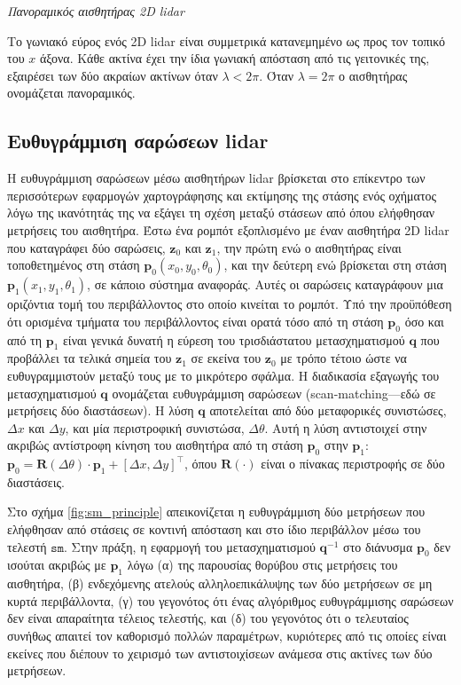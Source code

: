 \begin{bw_box}
\begin{definition}
  \textit{Πανοραμικός αισθητήρας 2D lidar}

  Το γωνιακό εύρος ενός 2D lidar είναι συμμετρικά κατανεμημένο ως προς τον
  τοπικό του $x$ άξονα. Κάθε ακτίνα έχει την ίδια γωνιακή απόσταση από τις
  γειτονικές της, εξαιρέσει των δύο ακραίων ακτίνων όταν $\lambda < 2\pi$.
  Όταν $\lambda = 2\pi$ ο αισθητήρας ονομάζεται πανοραμικός.
\end{definition}
\end{bw_box}



\subsection{Ευθυγράμμιση σαρώσεων lidar}
\label{subsec:01_01_02_5}

Η ευθυγράμμιση σαρώσεων μέσω αισθητήρων lidar βρίσκεται στο επίκεντρο των
περισσότερων εφαρμογών χαρτογράφησης και εκτίμησης της στάσης ενός οχήματος
λόγω της ικανότητάς της να εξάγει τη σχέση μεταξύ στάσεων από όπου ελήφθησαν
μετρήσεις του αισθητήρα. Έστω ένα ρομπότ εξοπλισμένο με έναν αισθητήρα 2D lidar
που καταγράφει δύο σαρώσεις, $\bm{z}_0$ και $\bm{z}_1$, την πρώτη ενώ ο
αισθητήρας είναι τοποθετημένος στη στάση $\bm{p}_0(x_0,y_0,\theta_0)$, και την
δεύτερη ενώ βρίσκεται στη στάση $\bm{p}_1(x_1,y_1,\theta_1)$, σε κάποιο σύστημα
αναφοράς. Αυτές οι σαρώσεις καταγράφουν μια οριζόντια τομή του περιβάλλοντος
στο οποίο κινείται το ρομπότ. Υπό την προϋπόθεση ότι ορισμένα τμήματα του
περιβάλλοντος είναι ορατά τόσο από τη στάση $\bm{p}_0$ όσο και από τη
$\bm{p}_1$ είναι γενικά δυνατή η εύρεση του τρισδιάστατου μετασχηματισμού
$\bm{q}$ που προβάλλει τα τελικά σημεία του $\bm{z}_1$ σε εκείνα του $\bm{z}_0$
με τρόπο τέτοιο ώστε να ευθυγραμμιστούν μεταξύ τους με το μικρότερο σφάλμα. Η
διαδικασία εξαγωγής του μετασχηματισμού $\bm{q}$ ονομάζεται ευθυγράμμιση
σαρώσεων (scan-matching---εδώ σε μετρήσεις δύο διαστάσεων). Η λύση $\bm{q}$
αποτελείται από δύο μεταφορικές συνιστώσες, $\Delta x$ και $\Delta y$, και μία
περιστροφική συνιστώσα, $\Delta\theta$. Αυτή η λύση αντιστοιχεί στην ακριβώς
αντίστροφη κίνηση του αισθητήρα από τη στάση $\bm{p}_0$ στην $\bm{p}_1$:
$\bm{p}_0 = \bm{R}(\Delta\theta) \cdot \bm{p}_1 + [\Delta x, \Delta y]^{\top}$,
όπου $\bm{R}(\cdot)$ είναι ο πίνακας περιστροφής σε δύο διαστάσεις.

Στο σχήμα \ref{fig:sm_principle} απεικονίζεται η ευθυγράμμιση δύο μετρήσεων που
ελήφθησαν από στάσεις σε κοντινή απόσταση και στο ίδιο περιβάλλον μέσω του
τελεστή $\texttt{sm}$. Στην πράξη, η εφαρμογή του μετασχηματισμού $\bm{q}^{-1}$
στο διάνυσμα $\bm{p}_0$ δεν ισούται ακριβώς με $\bm{p}_1$ λόγω (α) της
παρουσίας θορύβου στις μετρήσεις του αισθητήρα, (β) ενδεχόμενης ατελούς
αλληλοεπικάλυψης των δύο μετρήσεων σε μη κυρτά περιβάλλοντα, (γ) του γεγονότος
ότι ένας αλγόριθμος ευθυγράμμισης σαρώσεων δεν είναι απαραίτητα τέλειος
τελεστής, και (δ) του γεγονότος ότι ο τελευταίος συνήθως απαιτεί τον καθορισμό
πολλών παραμέτρων, κυριότερες από τις οποίες είναι εκείνες που διέπουν το
χειρισμό των αντιστοιχίσεων ανάμεσα στις ακτίνες των δύο μετρήσεων.

